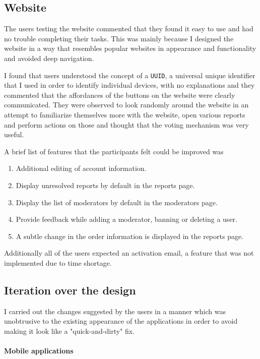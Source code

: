 \documentclass[12pt]{ecsproject}     %
\begin{document}
\subsection{Website}
The users testing the website commented that they found it easy to use and had no trouble completing their tasks. This was mainly because I designed the website in a way that resembles popular websites in appearance and functionality and avoided deep navigation.

I found that users understood the concept of a \texttt{UUID}, a universal unique identifier that I used in order to identify individual devices, with no explanations and they commented that the affordances of the buttons on the website were clearly communicated. They were observed to look randomly around the website in an attempt to familiarize themselves more with the website, open various reports and perform actions on those and thought that the voting mechanism was very useful.

A brief list of features that the participants felt could be improved was
\begin{enumerate}
\item Additional editing of account information.
\item Display unresolved reports by default in the reports page.
\item Display the list of moderators by default in the moderators page.
\item Provide feedback while adding a moderator, banning or deleting a user.
\item A subtle change in the order information is displayed in the reports page.
\end{enumerate}

Additionally all of the users expected an activation email, a feature that was not implemented due to time shortage. 

\subsection{Iteration over the design}
I carried out the changes suggested by the users in a manner which was unobtrusive to the existing appearance of the applications in order to avoid making it look like a "quick-and-dirty" fix.

\paragraph{Mobile applications}
\end{document}
